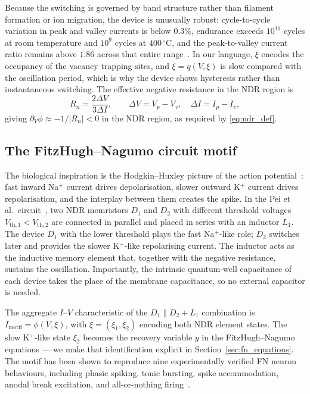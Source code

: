 \documentclass[11pt]{article}
\begin{document}
Because the switching is governed by band structure rather than filament
formation or ion migration, the device is unusually robust:
cycle-to-cycle variation in peak and valley currents is below $0.3\%$,
endurance exceeds $10^{11}$ cycles at room temperature and $10^9$
cycles at $400\,{}^\circ\mathrm{C}$, and the peak-to-valley current
ratio remains above $1.86$ across that entire range~\cite{pei2025}.
In our language, $\xi$ encodes the occupancy of the vacancy trapping
sites, and $\dot\xi = q(V,\xi)$ is slow compared with the oscillation
period, which is why the device shows hysteresis rather than
instantaneous switching. The effective negative resistance in the NDR
region is
\begin{equation}
  R_n = \frac{2\Delta V}{3\Delta I},
  \qquad
  \Delta V = V_p - V_v,\quad \Delta I = I_p - I_v,
  \label{eq:Rn}
\end{equation}
giving $\partial_V\phi \approx -1/|R_n| < 0$ in the NDR region, as
required by \eqref{eq:ndr_def}.

\subsection{The FitzHugh--Nagumo circuit motif}

The biological inspiration is the Hodgkin--Huxley picture of the action
potential~\cite{hodgkin1952}: fast inward Na$^+$ current drives
depolarisation, slower outward K$^+$ current drives repolarisation, and
the interplay between them creates the spike. In the Pei et al.\
circuit~\cite{pei2025}, two NDR memristors $D_1$ and $D_2$ with
different threshold voltages $V_{\mathrm{th},1} < V_{\mathrm{th},2}$
are connected in parallel and placed in series with an inductor $L_1$.
The device $D_1$ with the lower threshold plays the fast Na$^+$-like
role; $D_2$ switches later and provides the slower K$^+$-like
repolarising current. The inductor acts as the inductive memory element
that, together with the negative resistance, sustains the oscillation.
Importantly, the intrinsic quantum-well capacitance of each device
takes the place of the membrane capacitance, so no external capacitor
is needed.

The aggregate $I$--$V$ characteristic of the $D_1 \| D_2 + L_1$
combination is $I_{\mathrm{motif}} = \phi(V,\xi)$, with $\xi =
(\xi_1, \xi_2)$ encoding both NDR element states. The slow
K$^+$-like state $\xi_2$ becomes the recovery variable $y$ in the
FitzHugh--Nagumo equations --- we make that identification explicit in
Section~\ref{sec:fn_equations}. The motif has been shown to reproduce
nine experimentally verified FN neuron behaviours, including phasic
spiking, tonic bursting, spike accommodation, anodal break excitation,
and all-or-nothing firing~\cite{pei2025}.
\end{document}
